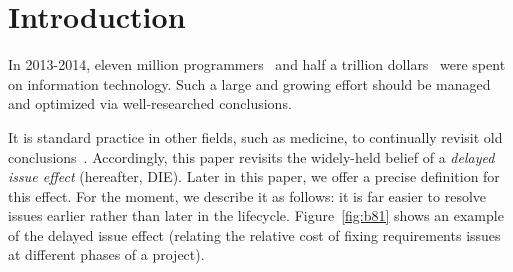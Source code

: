 \documentclass{sig-alternate}
\newcommand{\fig}[1]{Figure~\ref{fig:#1}}
\begin{document}
\section{Introduction}
In 2013-2014, 
eleven  million programmers~\cite{pettey14} and
half a trillion dollars~\cite{avram14} were spent on information technology.
Such a large and growing effort should be managed and optimized via  well-researched conclusions.  

It is standard practice
in other fields, such as medicine,
to continually revisit old conclusions~\cite{prasad13}.
Accordingly, this paper revisits
the widely-held belief of a {\em delayed issue effect} (hereafter, DIE).
Later in this paper, we offer a precise definition for this effect.
For the moment, we describe it as follows:
it is far easier to resolve issues earlier rather than later in the lifecycle.
 \fig{b81} shows an example of the delayed issue effect (relating
 the relative cost of fixing requirements issues at different phases of a project).
 
\end{document}
